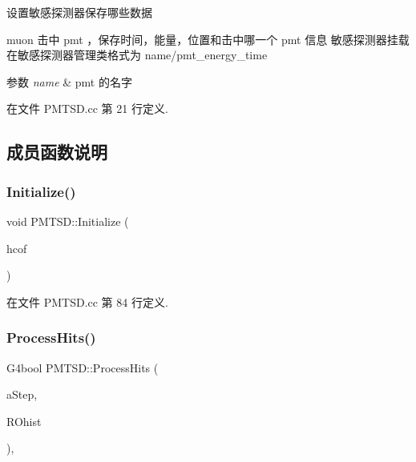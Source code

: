 设置敏感探测器保存哪些数据 

muon 击中 pmt ，保存时间，能量，位置和击中哪一个 pmt 信息 敏感探测器挂载在敏感探测器管理类格式为 name/pmt\+\_\+energy\+\_\+time 
\begin{DoxyParams}{参数}
{\em name} & pmt 的名字 \\
\hline
\end{DoxyParams}


在文件 P\+M\+T\+S\+D.\+cc 第 21 行定义.



\subsection{成员函数说明}
\mbox{\label{classPMTSD_af78a52d378f6d2832a6528e81975d385}} 
\subsubsection{\texorpdfstring{Initialize()}{Initialize()}}
{\footnotesize\ttfamily void P\+M\+T\+S\+D\+::\+Initialize (\begin{DoxyParamCaption}\item[{G4\+H\+Cof\+This\+Event $\ast$}]{hcof }\end{DoxyParamCaption})\hspace{0.3cm}{\ttfamily [override]}}



在文件 P\+M\+T\+S\+D.\+cc 第 84 行定义.

\mbox{\label{classPMTSD_ad901040792782721b858ac0a64a559bb}} 
\subsubsection{\texorpdfstring{Process\+Hits()}{ProcessHits()}}
{\footnotesize\ttfamily G4bool P\+M\+T\+S\+D\+::\+Process\+Hits (\begin{DoxyParamCaption}\item[{G4\+Step $\ast$}]{a\+Step,  }\item[{G4\+Touchable\+History $\ast$}]{R\+Ohist }\end{DoxyParamCaption})\hspace{0.3cm}{\ttfamily [override]}, {\ttfamily [protected]}}



